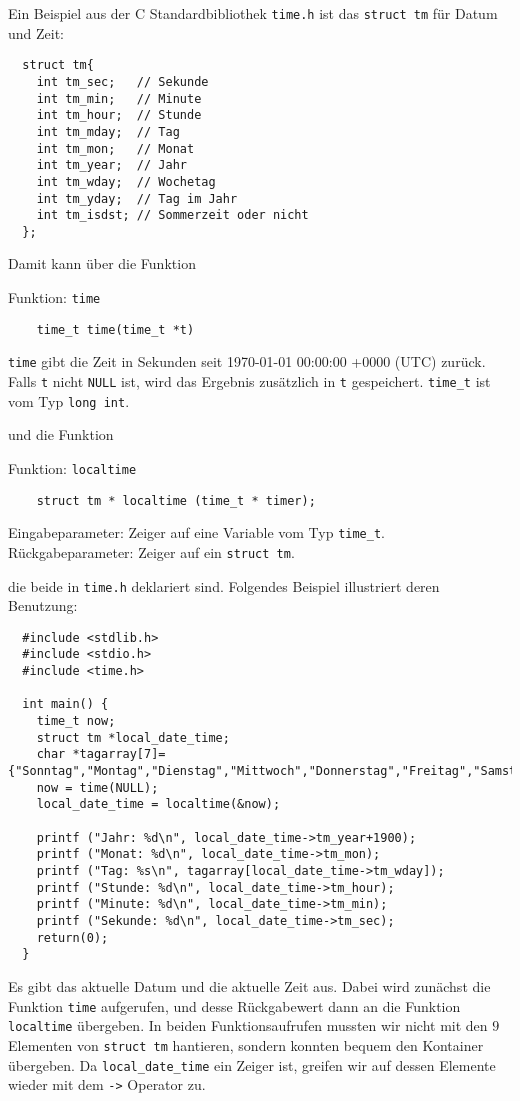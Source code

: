 Ein Beispiel aus der C Standardbibliothek \verb|time.h| ist das \verb|struct tm| für Datum und Zeit:
\begin{lstlisting}
  struct tm{
    int tm_sec;   // Sekunde
    int tm_min;   // Minute
    int tm_hour;  // Stunde
    int tm_mday;  // Tag
    int tm_mon;   // Monat
    int tm_year;  // Jahr
    int tm_wday;  // Wochetag
    int tm_yday;  // Tag im Jahr
    int tm_isdst; // Sommerzeit oder nicht
  };
\end{lstlisting}
Damit kann über die Funktion
\begin{myexampleblock}{Funktion: \texttt{time}}
  \begin{lstlisting}
    time_t time(time_t *t)
  \end{lstlisting}
  \vspace{-0.4cm}
  \verb|time| gibt die Zeit in Sekunden seit 1970-01-01 00:00:00 +0000 (UTC) zurück.
  Falls \verb|t| nicht \verb|NULL| ist, wird das Ergebnis zusätzlich in \verb|t| gespeichert.
  \verb|time_t| ist vom Typ \verb|long int|.
\end{myexampleblock}
und die Funktion
\begin{myexampleblock}{Funktion: \texttt{localtime}}
  \begin{lstlisting}
    struct tm * localtime (time_t * timer);
  \end{lstlisting}
  \vspace{-0.4cm}
  Eingabeparameter: Zeiger auf eine Variable vom Typ \verb|time_t|.
  Rückgabeparameter: Zeiger auf ein \verb|struct tm|.
\end{myexampleblock}
die beide in \verb|time.h| deklariert sind.
Folgendes Beispiel illustriert deren Benutzung:
\begin{lstlisting}
  #include <stdlib.h>
  #include <stdio.h>
  #include <time.h>
  
  int main() {
    time_t now;
    struct tm *local_date_time;
    char *tagarray[7]={"Sonntag","Montag","Dienstag","Mittwoch","Donnerstag","Freitag","Samstag"};
    now = time(NULL);
    local_date_time = localtime(&now);

    printf ("Jahr: %d\n", local_date_time->tm_year+1900);
    printf ("Monat: %d\n", local_date_time->tm_mon);
    printf ("Tag: %s\n", tagarray[local_date_time->tm_wday]);
    printf ("Stunde: %d\n", local_date_time->tm_hour);
    printf ("Minute: %d\n", local_date_time->tm_min);
    printf ("Sekunde: %d\n", local_date_time->tm_sec);
    return(0);
  }
\end{lstlisting}
Es gibt das aktuelle Datum und die aktuelle Zeit aus.
Dabei wird zunächst die Funktion \verb|time| aufgerufen, und desse Rückgabewert dann an die Funktion \verb|localtime| übergeben.
In beiden Funktionsaufrufen mussten wir nicht mit den $9$ Elementen von \verb|struct tm| hantieren, sondern konnten bequem den Kontainer übergeben.
Da \verb|local_date_time| ein Zeiger ist, greifen wir auf dessen Elemente wieder mit dem \verb|->| Operator zu.
